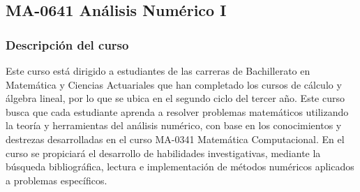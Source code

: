 \newpage

\subsection*{MA-0641 Análisis Numérico I}

\hypertarget{MA0641}{}
\begin{refsection}
\begin{table}[H]
\end{table}



\subsubsection*{Descripción del curso}

Este curso está dirigido a estudiantes de las carreras de Bachillerato en Matemática y Ciencias Actuariales que han completado los cursos de cálculo y álgebra lineal, por lo que se ubica en el segundo ciclo del tercer año. Este curso busca que cada estudiante aprenda a resolver problemas matemáticos utilizando la teoría y herramientas del análisis numérico, con base en los conocimientos y destrezas desarrolladas en el curso MA-0341 Matemática Computacional. En el curso se propiciará el desarrollo de habilidades investigativas, mediante la búsqueda bibliográfica, lectura e implementación de métodos numéricos aplicados a problemas específicos.


\end{refsection}
